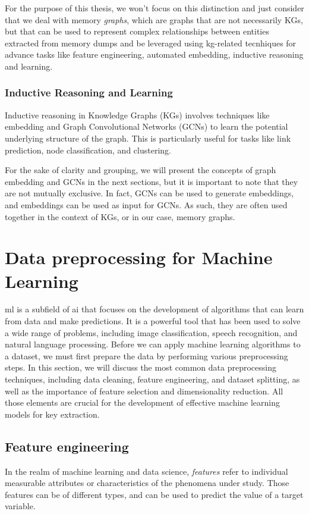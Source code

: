     For the purpose of this thesis, we won't focus on this distinction and just consider that we deal with memory \textit{graphs}, which are graphs that are not necessarily KGs, but that can be used to represent complex relationships between entities extracted from memory dumps and be leveraged using \acrshort{kg}-related tecnhiques for advance tasks like feature engineering, automated embedding, inductive reasoning and learning.

    \subsubsection{Inductive Reasoning and Learning}
    Inductive reasoning in Knowledge Graphs (KGs) involves techniques like embedding and Graph Convolutional Networks (GCNs) to learn the potential underlying structure of the graph. This is particularly useful for tasks like link prediction, node classification, and clustering.

    For the sake of clarity and grouping, we will present the concepts of graph embedding and GCNs in the next sections, but it is important to note that they are not mutually exclusive. In fact, GCNs can be used to generate embeddings, and embeddings can be used as input for GCNs. As such, they are often used together in the context of KGs, or in our case, memory graphs.

\section{Data preprocessing for Machine Learning}\label{sec:background:processing}
    \acrfull{ml} is a subfield of \acrfull{ai} that focuses on the development of algorithms that can learn from data and make predictions. It is a powerful tool that has been used to solve a wide range of problems, including image classification, speech recognition, and natural language processing. Before we can apply machine learning algorithms to a dataset, we must first prepare the data by performing various preprocessing steps. In this section, we will discuss the most common data preprocessing techniques, including data cleaning, feature engineering, and dataset splitting, as well as the importance of feature selection and dimensionality reduction. All those elements are crucial for the development of effective machine learning models for key extraction.

    \subsection{Feature engineering}
    In the realm of machine learning and data science, \textit{features} refer to individual measurable attributes or characteristics of the phenomena under study. Those features can be of different types, and can be used to predict the value of a target variable. 
    
